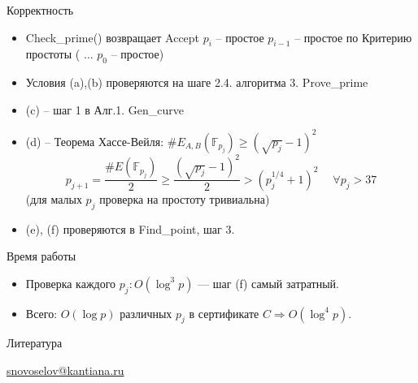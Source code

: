 \documentclass{beamer}
\begin{document}
\begin{frame}{Корректность}
\begin{itemize}
    \item Check\_prime() возвращает Accept \structure{$\Rightarrow$} $p_i$ -- простое \structure{$\Rightarrow$} $p_{i-1}$ -- простое по Критерию простоты (\structure{$\Rightarrow$} $\ldots$\structure{$\Rightarrow$} $p_0$ -- простое)
    
    \item Условия (a),(b) проверяются на шаге 2.4.  алгоритма 3. Prove\_prime
    
    \item (c) -- шаг 1 в Алг.1. Gen\_curve
    
    \item (d) -- Теорема Хассе-Вейля: $\#E_{A,B}(\mathbb{F}_{p_j}) \geq (\sqrt{p_j} - 1)^2$ \structure{$\Rightarrow$}
    \[
    p_{j+1} = \frac{\#E(\mathbb{F}_{p_j})}{2} \geq \frac{(\sqrt{p_j} - 1)^2}{2} > (p_j^{1/4} + 1)^2\; \quad \forall p_j > 37
    \]
    (для малых $p_j$ проверка на простоту тривиальна)
    
    \item (e), (f) проверяются в Find\_point, шаг 3.
\end{itemize}
\end{frame}

\begin{frame}{Время работы}
    \begin{itemize}
        \item Проверка каждого $p_j: O(\log^3 p)$ — шаг (f) самый затратный.
        \item Всего: $O(\log p)$ различных $p_j$ в сертификате $C \Rightarrow O(\log^4 p)$.
    \end{itemize}
\end{frame}

\begin{frame}{Литература}
    \nocite{Lenstra1987}
    \nocite{Washington2008}
    \nocite{GoldwasserKilian1999}
    \nocite{CohenLenstra1984}
    \printbibliography

    \begin{center}
        \begin{tcolorbox}[enhanced,hbox,colback=block-green-color-bg,colframe=subsection-color!120,title=Контакты,center title]
            \begin{varwidth}{\textwidth}
                \begin{center}
                    \href{mailto:snovoselov@kantiana.ru}{snovoselov@kantiana.ru}
                \end{center}
            \end{varwidth}
        \end{tcolorbox}	
    \end{center}
\end{frame}
\end{document}
